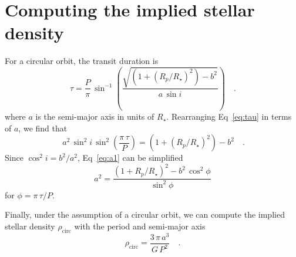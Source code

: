 \documentclass[floatfix,ApJL,twocolumn]{aastex631}
\begin{document}


{}


\appendix

\section{Computing the implied stellar density}\label{apdx:stellar_density}
For a circular orbit, the transit duration is \citep{Winn:2010:arXiv}
\begin{equation}~\label{eq:tau}
  \tau = \frac{P}{\pi}\,\sin^{-1}\left( \frac{\sqrt{(1 + (R_{p}/R_{\star})^2) - b^2}}{a\,\sin i} \right) \quad. \,
\end{equation}
where $a$ is the semi-major axis in units of $R_\star$. 
Rearranging Eq~\ref{eq:tau} in terms of $a$, we find that
\begin{equation}~\label{eq:a1}
  a^2\,\sin^2 i\,\sin^2\left(\frac{\pi\,\tau}{P}\right) = (1 + (R_{p}/R_{\star})^2) - b^2 \quad.
\end{equation}
Since $\cos^2 i = b^2 / a^2$, Eq~\ref{eq:a1} can be simplified
\begin{equation}
  a^2 = \frac{(1 + R_{p}/R_{\star})^2 - b^2\,\cos^2\phi}{\sin^2\phi}
\end{equation}
for $\phi = \pi\,\tau / P$.

Finally, under the assumption of a circular orbit, we can compute the implied stellar density $\rho_\mathrm{circ}$ with the period and semi-major axis
\begin{equation}
  \rho_\mathrm{circ} = \frac{3\,\pi\,a^3}{G\,P^2} \quad.
\end{equation}
\end{document}
